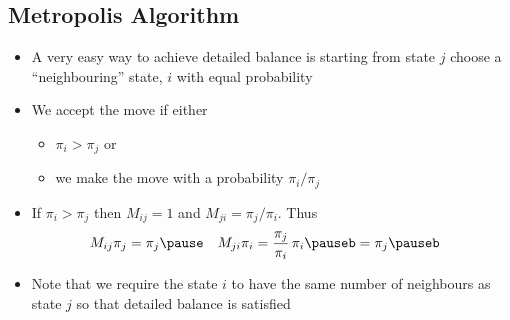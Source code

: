 \begin{slide}
\section{Metropolis Algorithm}

\begin{PauseHighLight}
  \begin{itemize}
  \item A very easy way to achieve detailed balance is starting from
    state $j$ choose a ``neighbouring'' state, $i$ with equal
    probability\pause
  \item We accept the move if either
    \begin{itemize}
    \item $\pi_i>\pi_j$ or
    \item we make the move with a probability $\pi_i/\pi_j$\pause
    \end{itemize}
  \item If $\pi_i>\pi_j$ then $M_{ij}=1$ and $M_{ji} =
    \pi_j/\pi_i$. Thus
    \begin{align*}
      M_{ij} \pi_j &= \pi_j \pause &
                               M_{ji} \pi_i &=
                                              \frac{\pi_j}{\pi_i}\,\pi_i \pauseb=\pi_j\pauseb 
    \end{align*}
  \item Note that we require the state $i$ to have the same number of
    neighbours as state $j$ so that detailed balance is satisfied\pause
  \end{itemize}
\end{PauseHighLight}

\end{slide}


